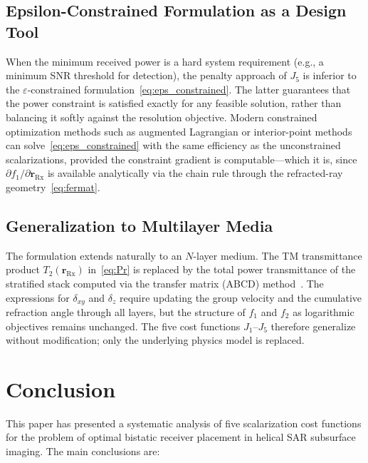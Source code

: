 \documentclass[journal]{IEEEtran}
\newcommand{\Rx}{\mathrm{Rx}}
\newcommand{\rRx}{\mathbf{r}_{\Rx}}
\newcommand{\dxy}{\delta_{xy}}
\newcommand{\dz}{\delta_z}
\begin{document}
\subsection{Epsilon-Constrained Formulation as a Design Tool}

When the minimum received power is a hard system requirement (e.g., a minimum
SNR threshold for detection), the penalty approach of $J_5$ is inferior to the
$\varepsilon$-constrained formulation~\eqref{eq:eps_constrained}. The latter
guarantees that the power constraint is satisfied exactly for any feasible
solution, rather than balancing it softly against the resolution objective.
Modern constrained optimization methods such as augmented Lagrangian or
interior-point methods can solve~\eqref{eq:eps_constrained} with the same
efficiency as the unconstrained scalarizations, provided the constraint gradient
is computable—which it is, since $\partial f_1 / \partial \rRx$ is available
analytically via the chain rule through the refracted-ray
geometry~\eqref{eq:fermat}.

\subsection{Generalization to Multilayer Media}

The formulation extends naturally to an $N$-layer medium. The TM
transmittance product $T_2(\rRx)$ in~\eqref{eq:Pr} is replaced by the total
power transmittance of the stratified stack computed via the transfer matrix
(ABCD) method~\cite{balanis2012}. The expressions for $\dxy$ and $\dz$ require
updating the group velocity and the cumulative refraction angle through all
layers, but the structure of $f_1$ and $f_2$ as logarithmic objectives remains
unchanged. The five cost functions $J_1$–$J_5$ therefore generalize without
modification; only the underlying physics model is replaced.

\section{Conclusion}
\label{sec:conclusion}

This paper has presented a systematic analysis of five scalarization cost
functions for the problem of optimal bistatic receiver placement in helical SAR
subsurface imaging. The main conclusions are:
\end{document}
